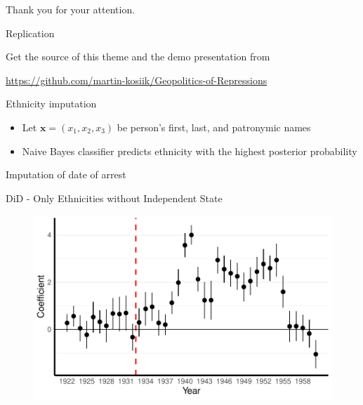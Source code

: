 \documentclass[11pt]{beamer}
\begin{document}
{
\begin{frame}[standout]
  Thank you for your attention.
\end{frame}
}

\appendix

\begin{frame}{Replication}

  Get the source of this theme and the demo presentation from

  \begin{center}\url{https://github.com/martin-kosiik/Geopolitics-of-Repressions}\end{center}

\end{frame}



\begin{frame}[label=ethnicity_imputation]{Ethnicity imputation}
\begin{itemize}
    \item Let  $\boldsymbol{x} = \left(x_1, x_2, x_3\right)$ be person's first, last, and patronymic names
    \item Naive Bayes classifier predicts ethnicity with the highest posterior probability

\end{itemize}
\hyperlink{data}{}
\end{frame}

\begin{frame}[label=arrest_date_imputation]{Imputation of date of arrest}

\hyperlink{data}{}
\end{frame}



\begin{frame}[label=did_without_ind_state]{DiD - Only Ethnicities without Independent State}
 \begin{figure}[h]
\centering
\includegraphics[width=1\textwidth]{pr_cr2_date_imp_full_years_no_trends_not_ind_country.pdf}
\end{figure}

\hyperlink{robustness_checks}{}
\end{frame}
\end{document}
